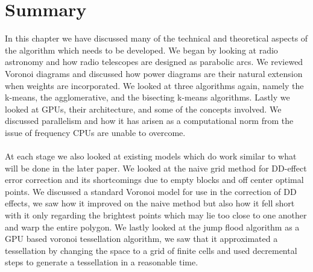 \section{Summary}\label{sum}
In this chapter we have discussed many of the technical and theoretical aspects of the algorithm which needs to be developed. We began by looking at radio astronomy and how radio telescopes are designed as parabolic arcs. We reviewed Voronoi diagrams and discussed how power diagrams are their natural extension when weights are incorporated. We looked at three algorithms again, namely the k-means, the agglomerative, and the bisecting k-means algorithms. Lastly we looked at GPUs, their architecture, and some of the concepts involved. We discussed parallelism and how it has arisen as a computational norm from the issue of frequency CPUs are unable to overcome.
\\
\\
At each stage we also looked at existing models which do work similar to what will be done in the later paper. We looked at the naive grid method for DD-effect error correction and its shortcomings due to empty blocks and off center optimal points. We discussed a standard Voronoi model for use in the correction of DD effects, we saw how it improved on the naive method but also how it fell short with it only regarding the brightest points which may lie too close to one another and warp the entire polygon. We lastly looked at the jump flood algorithm as a GPU based voronoi tessellation algorithm, we saw that it approximated a tessellation by changing the space to a grid of finite cells and used decremental steps to generate a tessellation in a reasonable time.
